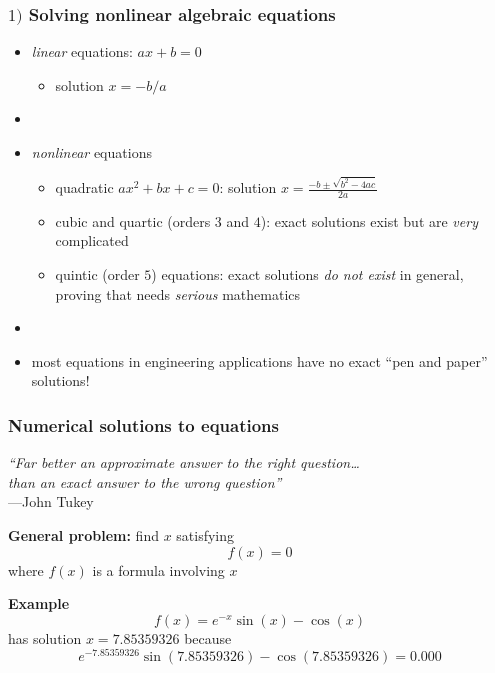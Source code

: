 \documentclass[english,14pt]{beamer}
\newcommand\red[1]{{\color{red} #1}}
\begin{document}
\begin{frame}[fragile]

\frametitle{$1)$ Solving nonlinear algebraic equations}

\begin{itemize}
	\item \red{\emph{linear}} equations: $ax + b = 0$
	\begin{itemize}
		\item solution $x = -b/a$
	\end{itemize}
	\item[]
	\item \red{\emph{nonlinear}} equations
	\begin{itemize}
		\item quadratic $ax^2 + bx+c = 0$: solution $x = \frac{-b \pm\sqrt{b^2-4ac}}{2a}$
		\item cubic and quartic (orders $3$ and $4$): exact solutions exist but are \emph{very} complicated
		\item quintic (order $5$) equations: exact solutions \emph{do not exist} in general, proving that needs \emph{serious} mathematics
	\end{itemize}
	\item[]
	\item most equations in engineering applications have no exact ``pen and paper'' solutions!
	
	
\end{itemize}

\end{frame}


\begin{frame}[fragile]

\frametitle{Numerical solutions to equations}

\begin{flushright}
\small\emph{``Far better an approximate answer to the right question\ldots \\ than an exact answer to the wrong question''}\\---John Tukey
\end{flushright}
\vspace*{-3mm}
\textbf{General problem:} find $x$ satisfying
	\[
		f(x) = 0
	\]
	where $f(x)$ is a formula involving $x$
	
	\textbf{Example}
	\[
		f(x) = e^{-x}\sin(x) - \cos(x)
	\]
	has solution $x = 7.85359326$ because
	\[
	e^{-7.85359326}\sin(7.85359326) - \cos(7.85359326) = 0.000
	\]

\end{frame}
\end{document}

